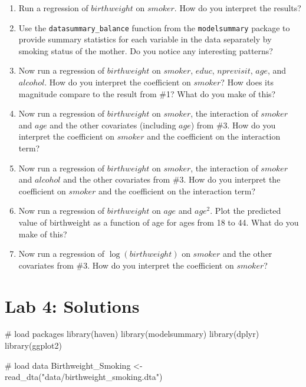 \documentclass[
  letterpaper,
  DIV=11,
  numbers=noendperiod]{scrreprt}
\newenvironment{Shaded}{\begin{snugshade}}{\end{snugshade}}
\newcommand{\CommentTok}[1]{\textcolor[rgb]{0.37,0.37,0.37}{#1}}
\newcommand{\FunctionTok}[1]{\textcolor[rgb]{0.28,0.35,0.67}{#1}}
\newcommand{\NormalTok}[1]{\textcolor[rgb]{0.00,0.23,0.31}{#1}}
\newcommand{\OtherTok}[1]{\textcolor[rgb]{0.00,0.23,0.31}{#1}}
\newcommand{\StringTok}[1]{\textcolor[rgb]{0.13,0.47,0.30}{#1}}
\begin{document}
\begin{enumerate}
\def\labelenumi{\arabic{enumi}.}
\item
  Run a regression of \(birthweight\) on \(smoker\). How do you
  interpret the results?
\item
  Use the \texttt{datasummary\_balance} function from the
  \texttt{modelsummary} package to provide summary statistics for each
  variable in the data separately by smoking status of the mother. Do
  you notice any interesting patterns?
\item
  Now run a regression of \(birthweight\) on \(smoker\), \(educ\),
  \(nprevisit\), \(age\), and \(alcohol\). How do you interpret the
  coefficient on \(smoker\)? How does its magnitude compare to the
  result from \#1? What do you make of this?
\item
  Now run a regression of \(birthweight\) on \(smoker\), the interaction
  of \(smoker\) and \(age\) and the other covariates (including \(age\))
  from \#3. How do you interpret the coefficient on \(smoker\) and the
  coefficient on the interaction term?
\item
  Now run a regression of \(birthweight\) on \(smoker\), the interaction
  of \(smoker\) and \(alcohol\) and the other covariates from \#3. How
  do you interpret the coefficient on \(smoker\) and the coefficient on
  the interaction term?
\item
  Now run a regression of \(birthweight\) on \(age\) and \(age^2\). Plot
  the predicted value of birthweight as a function of age for ages from
  18 to 44. What do you make of this?
\item
  Now run a regression of \(\log(birthweight)\) on \(smoker\) and the
  other covariates from \#3. How do you interpret the coefficient on
  \(smoker\)?
\end{enumerate}

\section{Lab 4: Solutions}\label{lab-4-solutions}

\begin{Shaded}
\begin{Highlighting}[]
\CommentTok{\# load packages}
\FunctionTok{library}\NormalTok{(haven)}
\FunctionTok{library}\NormalTok{(modelsummary)}
\FunctionTok{library}\NormalTok{(dplyr)}
\FunctionTok{library}\NormalTok{(ggplot2)}

\CommentTok{\# load data}
\NormalTok{Birthweight\_Smoking }\OtherTok{\textless{}{-}} \FunctionTok{read\_dta}\NormalTok{(}\StringTok{"data/birthweight\_smoking.dta"}\NormalTok{)}
\end{Highlighting}
\end{Shaded}
\end{document}
